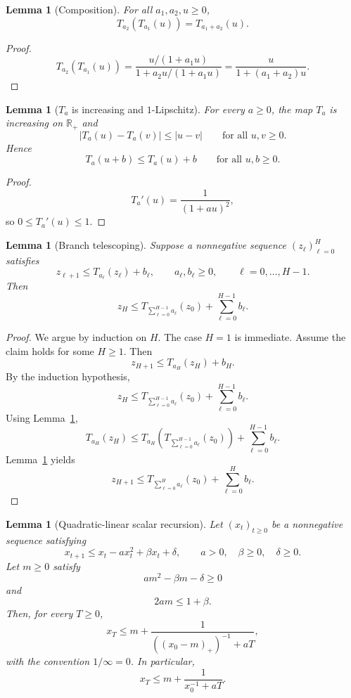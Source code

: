 \documentclass{article}
\newtheorem{lemma}[theorem]{Lemma}
\theoremstyle{definition}
\newcommand{\RR}{\mathbb R}
\begin{document}
\begin{lemma}[Composition]
\label{lem:Ta-comp}
For all $a_1,a_2,u\ge 0$,
\[
T_{a_2}(T_{a_1}(u))=T_{a_1+a_2}(u).\]
\end{lemma}

\begin{proof}
\[
T_{a_2}(T_{a_1}(u))
=
\frac{u/(1+a_1u)}{1+a_2u/(1+a_1u)}
=
\frac{u}{1+(a_1+a_2)u}.
\]
\end{proof}

\begin{lemma}[$T_a$ is increasing and $1$-Lipschitz]
\label{lem:Ta-Lip}
For every $a\ge 0$, the map $T_a$ is increasing on $\RR_+$ and
\[
|T_a(u)-T_a(v)|\le |u-v|
\qquad
\text{for all }u,v\ge 0.\]
Hence
\[
T_a(u+b)\le T_a(u)+b
\qquad
\text{for all }u,b\ge 0.\]
\end{lemma}

\begin{proof}
\[
T_a'(u)=\frac{1}{(1+a u)^2},
\]
so $0\le T_a'(u)\le 1$.
\end{proof}

\begin{lemma}[Branch telescoping]
\label{lem:telescope}
Suppose a nonnegative sequence $(z_\ell)_{\ell=0}^H$ satisfies
\[
z_{\ell+1}\le T_{a_\ell}(z_\ell)+b_\ell,
\qquad
a_\ell,b_\ell\ge 0,
\qquad
\ell=0,\dots,H-1.\]
Then
\[
z_H
\le
T_{\sum_{\ell=0}^{H-1}a_\ell}(z_0)
+
\sum_{\ell=0}^{H-1}b_\ell.\]
\end{lemma}

\begin{proof}
We argue by induction on $H$. The case $H=1$ is immediate. Assume the claim
holds for some $H\ge 1$. Then
\[
z_{H+1}\le T_{a_H}(z_H)+b_H.
\]
By the induction hypothesis,
\[
z_H
\le
T_{\sum_{\ell=0}^{H-1}a_\ell}(z_0)
+
\sum_{\ell=0}^{H-1}b_\ell.
\]
Using Lemma~\ref{lem:Ta-Lip},
\[
T_{a_H}(z_H)
\le
T_{a_H}\!\left(T_{\sum_{\ell=0}^{H-1}a_\ell}(z_0)\right)
+
\sum_{\ell=0}^{H-1}b_\ell.
\]
Lemma~\ref{lem:Ta-comp} yields
\[
z_{H+1}
\le
T_{\sum_{\ell=0}^{H}a_\ell}(z_0)+\sum_{\ell=0}^{H}b_\ell.
\]
\end{proof}

\begin{lemma}[Quadratic-linear scalar recursion]
\label{lem:scalar}
Let $(x_t)_{t\ge 0}$ be a nonnegative sequence satisfying
\[
x_{t+1}\le x_t-a x_t^2+\beta x_t+\delta,
\qquad
a>0,\quad \beta\ge 0,\quad \delta\ge 0.\]
Let $m\ge 0$ satisfy
\begin{equation}
a m^2-\beta m-\delta\ge 0
\label{eq:scalar-super-app}\end{equation}
and
\begin{equation}
2am\le 1+\beta.
\label{eq:scalar-safe-app}\end{equation}
Then, for every $T\ge 0$,
\[
x_T
\le
m+\frac{1}{((x_0-m)_+)^{-1}+aT},\]
with the convention $1/\infty=0$. In particular,
\[
x_T\le m+\frac{1}{x_0^{-1}+aT}.\]
\end{lemma}
\end{document}
